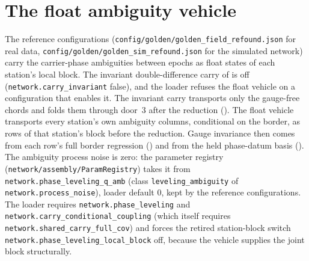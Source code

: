 \documentclass[main.tex]{subfiles}
\begin{document}

\section{The float ambiguity vehicle}
\label{sec:net-vehicle}

\providecommand{\Nss}{\bm{N}_{ss}}            %
\providecommand{\Nrr}{\bm{N}_{rr}}            %
\providecommand{\Nsr}{\bm{N}_{sr}}            %
\providecommand{\redNss}{\tilde{\bm{N}}_{ss}} %
\providecommand{\redus}{\tilde{\bm{u}}_s}     %
\providecommand{\xshared}{\bm{x}_s}           %
\providecommand{\xlocal}[1]{\bm{x}_{#1}}      %
\providecommand{\vehM}[1]{\bm{m}_{#1}}        %
\providecommand{\vehSig}{\bm{\Sigma}_{C}}     %
\providecommand{\vehF}{\bm{F}_{\!S}}          %
\providecommand{\vehxlin}[1]{x^{\mathrm{lin}}_{#1}} %

The reference configurations (\texttt{config/golden/golden\_field\_refound.json}
for real data, \texttt{config/golden/golden\_sim\_refound.json} for the
simulated network) carry the carrier-phase ambiguities between epochs as
float states of each station's local block. The invariant double-difference
carry of  is off
(\texttt{network.carry\_invariant} false), and the loader refuses the float
vehicle on a configuration that enables it. The invariant carry transports only
the gauge-free chords and folds them through door~3 after the reduction
(). The float vehicle
transports every station's own ambiguity columns, conditional on the
border, as rows of that station's block before the reduction. Gauge
invariance then comes from each row's full border regression
() and from the held phase-datum basis
(). The ambiguity process noise is zero: the
parameter registry (\texttt{network/assembly/ParamRegistry}) takes it from
\texttt{network.phase\_leveling\_q\_amb} (class \texttt{leveling\_ambiguity}
of \texttt{network.process\_noise}), loader default $0$, kept by the
reference configurations. The loader requires \texttt{network.phase\_leveling}
and \texttt{network.carry\_conditional\_coupling} (which itself requires
\texttt{network.shared\_carry\_full\_cov}) and forces the retired
station-block switch \texttt{network.phase\_leveling\_local\_block} off,
because the vehicle supplies the joint block structurally.
\end{document}

